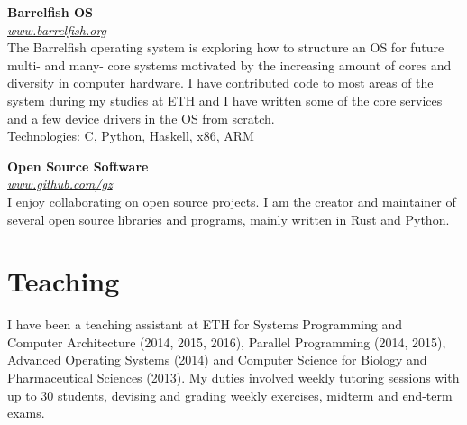 \documentclass[margin,line]{resume}
\begin{document}
\begin{resume}
\textbf{Barrelfish OS} \\\vspace{1mm}%
\textsl{\url{www.barrelfish.org}} \hfill \\
The Barrelfish operating system is exploring how to structure an OS for future
multi- and many- core systems motivated by the increasing amount of cores and
diversity in computer hardware. I have contributed code to most areas of the
system during my studies at ETH and I have written some of the core services
and a few device drivers in the OS from scratch.\\ Technologies: C, Python,
Haskell, x86, ARM

\textbf{Open Source Software} \\\vspace{1mm}%
\textsl{\url{www.github.com/gz}} \hfill \\
I enjoy collaborating on open source projects. I am the creator and maintainer
of several open source libraries and programs, mainly written in Rust and
Python.

\section{\mysidestyle Teaching}

I have been a teaching assistant at ETH for Systems Programming and Computer
Architecture (2014, 2015, 2016), Parallel Programming (2014, 2015), Advanced
Operating Systems (2014) and Computer Science for Biology and Pharmaceutical
Sciences (2013). My duties involved weekly tutoring sessions with up to 30
students, devising and grading weekly exercises, midterm and end-term exams.


\end{resume}
\end{document}
